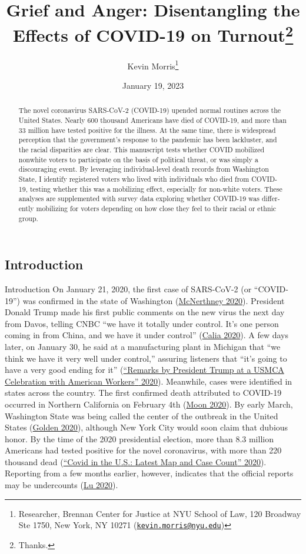 \documentclass[
  12pt,
]{article}
\title{Grief and Anger: Disentangling the Effects of COVID-19 on Turnout\thanks{Thanks.}}
\author{Kevin Morris\footnote{Researcher, Brennan Center for Justice at NYU School of Law, 120 Broadway Ste 1750, New York, NY 10271 (\href{mailto:kevin.morris@nyu.edu}{\nolinkurl{kevin.morris@nyu.edu}})}}
\date{January 19, 2023}
\begin{document}
\maketitle
\begin{abstract}
The novel coronavirus SARS-CoV-2 (COVID-19) upended normal routines across the United States. Nearly 600 thousand Americans have died of COVID-19, and more than 33 million have tested positive for the illness. At the same time, there is widespread perception that the government's response to the pandemic has been lackluster, and the racial disparities are clear. This manuscript tests whether COVID mobilized nonwhite voters to participate on the basis of political threat, or was simply a discouraging event. By leveraging individual-level death records from Washington State, I identify registered voters who lived with individuals who died from COVID- 19, testing whether this was a mobilizing effect, especially for non-white voters. These analyses are supplemented with survey data exploring whether COVID-19 was differ- ently mobilizing for voters depending on how close they feel to their racial or ethnic group.
\end{abstract}

\pagebreak

\doublespacing

\hypertarget{introduction}{%
\subsection*{Introduction}\label{introduction}}

Introduction
On January 21, 2020, the first case of SARS-CoV-2 (or ``COVID-19'') was confirmed in the state of Washington (\protect\hyperlink{ref-McNerthney2020}{McNerthney 2020}). President Donald Trump made his first public comments on the new virus the next day from Davos, telling CNBC ``we have it totally under control. It's one person coming in from China, and we have it under control'' (\protect\hyperlink{ref-Calia2020}{Calia 2020}). A few days later, on January 30, he said at a manufacturing plant in Michigan that ``we think we have it very well under control,'' assuring listeners that ``it's going to have a very good ending for it'' (\protect\hyperlink{ref-whitehouse2020}{{``Remarks by {President Trump} at a {USMCA Celebration} with {American Workers}''} 2020}). Meanwhile, cases were identified in states across the country. The first confirmed death attributed to COVID-19 occurred in Northern California on February 4th (\protect\hyperlink{ref-Moon2020}{Moon 2020}). By early March, Washington State was being called the center of the outbreak in the United States (\protect\hyperlink{ref-Golden2020}{Golden 2020}), although New York City would soon claim that dubious honor. By the time of the 2020 presidential election, more than 8.3 million Americans had tested positive for the novel coronavirus, with more than 220 thousand dead (\protect\hyperlink{ref-nyt2020}{{``Covid in the {U}.{S}.: {Latest Map} and {Case Count}''} 2020}). Reporting from a few months earlier, however, indicates that the official reports may be undercounts (\protect\hyperlink{ref-Lu2020}{Lu 2020}).
\end{document}
